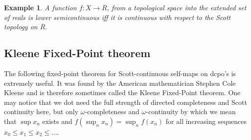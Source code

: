 \documentclass[a4paper,12pt]{article}
\newtheorem{example}[theorem]{Example}
\begin{document}
\begin{example}
A function $f: X \rightarrow \overline{R}$, from a topological space into the extended set of reals is lower semicontinuous iff it is continuous with respect to the Scott topology on $\overline{R}$.
\end{example}

\subsection{Kleene Fixed-Point theorem}
The following fixed-point theorem for Scott-continuous self-maps on dcpo's is extremely useful. It was found by the American mathematician Stephen Cole Kleene and is therefore sometimes called the Kleene Fixed-Point theorem. One may notice that we dot need the full strength of directed completeness and Scott continuity here, but only $\omega$-completeness and $\omega$-continuity by which we mean that $\sup x_n$ exists and $f(\sup_n x_n) = \sup_n f(x_n)$ for all increasing sequences $x_0 \leq x_1 \leq x_2 \leq ...$.
\end{document}
